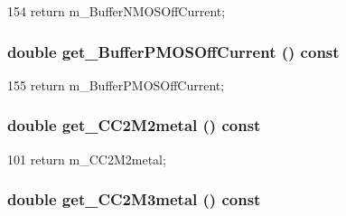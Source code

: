 \begin{DoxyCode}
154 { return m_BufferNMOSOffCurrent; }
\end{DoxyCode}
\hypertarget{classTechParameter_a30d0632ddefd780bb1bc6a0e9e5c0150}{
\subsubsection[{get\_\-BufferPMOSOffCurrent}]{\setlength{\rightskip}{0pt plus 5cm}double get\_\-BufferPMOSOffCurrent () const}}
\label{classTechParameter_a30d0632ddefd780bb1bc6a0e9e5c0150}



\begin{DoxyCode}
155 { return m_BufferPMOSOffCurrent; }
\end{DoxyCode}
\hypertarget{classTechParameter_ad71175b50d05e7d906fdb0fba379916a}{
\subsubsection[{get\_\-CC2M2metal}]{\setlength{\rightskip}{0pt plus 5cm}double get\_\-CC2M2metal () const}}
\label{classTechParameter_ad71175b50d05e7d906fdb0fba379916a}



\begin{DoxyCode}
101 { return m_CC2M2metal; }
\end{DoxyCode}
\hypertarget{classTechParameter_a087e2078fed843d7abf4ada6b39f9cf9}{
\subsubsection[{get\_\-CC2M3metal}]{\setlength{\rightskip}{0pt plus 5cm}double get\_\-CC2M3metal () const}}
\label{classTechParameter_a087e2078fed843d7abf4ada6b39f9cf9}



